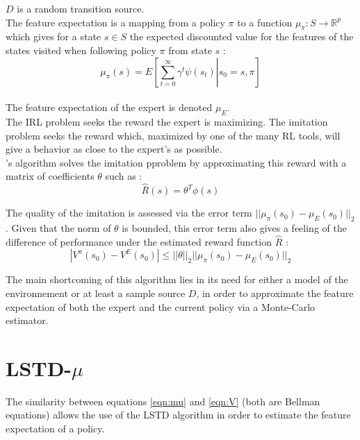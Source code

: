 \documentclass{article}
\begin{document}
$D$ is a random transition source.\\

The feature expectation is a mapping from a policy $\pi$ to a function $\mu_\pi : S \rightarrow \mathbb{R}^p$ which gives for a state $s\in S$ the expected discounted value for the features of the states visited when following policy $\pi$ from state $s$ :
\begin{equation}
\mu_\pi(s) = E\left[\left.\sum\limits_{t=0}^{\infty}\gamma^t\psi(s_t)\right|s_0=s,\pi\right]
\label{eqn:mu}
\end{equation}\\
The feature expectation of the expert is denoted $\mu_E$.\\

The IRL problem seeks the reward the expert is maximizing. The imitation problem seeks the reward which, maximized by one of the many RL tools, will give a behavior as close to the expert's as possible.\\

\citet{abbeel2004apprenticeship}'s algorithm solves the imitation pproblem by approximating this reward with a matrix of coefficients $\theta$ such as :
\begin{equation}
\hat R(s) = \theta^T\phi(s)
\end{equation}

The quality of the imitation is assessed via the error term $||\mu_\pi(s_0)-\mu_E(s_0)||_2$. Given that the norm of $\theta$ is bounded, this error term also gives a feeling of the difference of performance under the estimated reward function $\hat R$ :
\begin{equation}
|V^\pi(s_0)-V^E(s_0)| \leq ||\theta||_2||\mu_\pi(s_0)-\mu_E(s_0)||_2
\label{eqn:vmu}
\end{equation}

The main shortcoming of this algorithm lies in its need for either a model of the environnement or at least a sample source $D$, in order to approximate the feature expectation of both the expert and the current policy via a Monte-Carlo estimator.
\section{LSTD-$\mu$}
\label{sec:lstdmu}
The similarity between equations \ref{eqn:mu} and \ref{eqn:V} (both are Bellman equations) allows the use of the LSTD algorithm in order to estimate the feature expectation of a policy.\\
\end{document}
